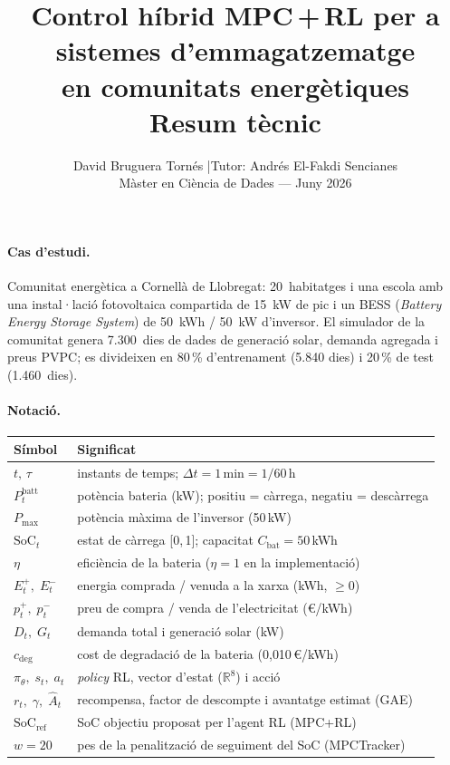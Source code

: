 \documentclass[a4paper,11pt]{article}
\title{\textbf{Control híbrid MPC\,+\,RL per a sistemes d'emmagatzematge\\
en comunitats energètiques}\\[5pt]
\large Resum tècnic}
\author{David Bruguera Tornés \quad|\quad Tutor: Andrés El-Fakdi Sencianes\\
\small Màster en Ciència de Dades --- Juny 2026}
\date{}
\begin{document}
\maketitle
\thispagestyle{empty}

\paragraph{Cas d'estudi.}
Comunitat energètica a Cornellà de Llobregat: 20~habitatges i una escola
amb una instal·lació fotovoltaica compartida de 15~kW de pic i un BESS
(\emph{Battery Energy Storage System}) de 50~kWh / 50~kW d'inversor.
El simulador de la comunitat genera 7.300~dies de dades de generació solar,
demanda agregada i preus PVPC;
es divideixen en 80\,\% d'entrenament (5.840 dies) i 20\,\% de test (1.460~dies).

\paragraph{Notació.}
\begin{center}\small
\begin{tabular}{@{}ll@{}}
\toprule
\textbf{Símbol} & \textbf{Significat} \\
\midrule
$t,\,\tau$                        & instants de temps; $\Delta t = 1\,\text{min} = 1/60\,\text{h}$ \\
$P_t^{\mathrm{batt}}$             & potència bateria (kW); positiu = càrrega, negatiu = descàrrega \\
$P_{\max}$                        & potència màxima de l'inversor (50\,kW) \\
$\mathrm{SoC}_t$                  & estat de càrrega [0,\,1]; capacitat $C_{\mathrm{bat}}=50$\,kWh \\
$\eta$                            & eficiència de la bateria ($\eta=1$ en la implementació) \\
$E^+_t,\;E^-_t$                   & energia comprada / venuda a la xarxa (kWh, $\geq 0$) \\
$p^+_t,\;p^-_t$                   & preu de compra / venda de l'electricitat (€/kWh) \\
$D_t,\;G_t$                       & demanda total i generació solar (kW) \\
$c_{\mathrm{deg}}$                & cost de degradació de la bateria (0{,}010\,€/kWh) \\
$\pi_\theta,\;s_t,\;a_t$          & \textit{policy} RL, vector d'estat ($\mathbb{R}^8$) i acció \\
$r_t,\;\gamma,\;\hat{A}_t$        & recompensa, factor de descompte i avantatge estimat (GAE) \\
$\mathrm{SoC}_{\mathrm{ref}}$     & SoC objectiu proposat per l'agent RL (MPC+RL) \\
$w=20$                            & pes de la penalització de seguiment del SoC (MPCTracker) \\
\bottomrule
\end{tabular}
\end{center}
\end{document}
